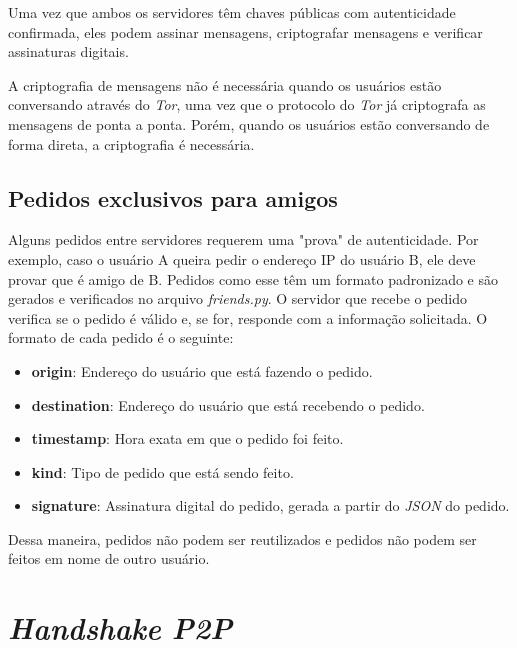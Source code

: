 Uma vez que ambos os servidores têm chaves públicas com autenticidade confirmada, eles podem assinar mensagens, criptografar mensagens e verificar assinaturas digitais.

A criptografia de mensagens não é necessária quando os usuários estão conversando através do \textit{Tor}, uma vez que o protocolo do \textit{Tor} já criptografa as mensagens de ponta a ponta. Porém, quando os usuários estão conversando de forma direta, a criptografia é necessária.

\subsection{Pedidos exclusivos para amigos}

Alguns pedidos entre servidores requerem uma "prova" de autenticidade. Por exemplo, caso o usuário A queira pedir o endereço IP do usuário B, ele deve provar que é amigo de B. Pedidos como esse têm um formato padronizado e são gerados e verificados no arquivo \textit{friends.py}. O servidor que recebe o pedido verifica se o pedido é válido e, se for, responde com a informação solicitada. O formato de cada pedido é o seguinte:

\begin{itemize}
    \item \textbf{origin}: Endereço do usuário que está fazendo o pedido.
    \item \textbf{destination}: Endereço do usuário que está recebendo o pedido.
    \item \textbf{timestamp}: Hora exata em que o pedido foi feito.
    \item \textbf{kind}: Tipo de pedido que está sendo feito.
    \item \textbf{signature}: Assinatura digital do pedido, gerada a partir do \textit{JSON} do pedido.
\end{itemize}

Dessa maneira, pedidos não podem ser reutilizados e pedidos não podem ser feitos em nome de outro usuário.

\section{\textit{Handshake} \textit{P2P}}

